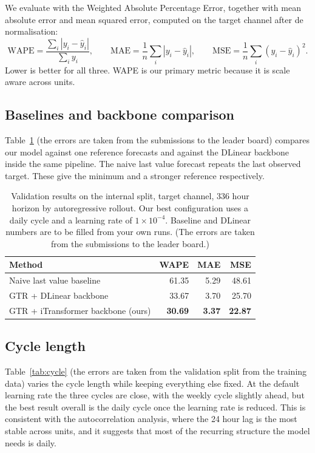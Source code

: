 \documentclass[11pt]{article}
\begin{document}
We evaluate with the Weighted Absolute Percentage Error, together with mean absolute error and
mean squared error, computed on the target channel after de normalisation:
\begin{equation}
\mathrm{WAPE} = \frac{\sum_i |y_i-\hat{y}_i|}{\sum_i y_i}, \qquad
\mathrm{MAE} = \frac{1}{n}\sum_i |y_i-\hat{y}_i|, \qquad
\mathrm{MSE} = \frac{1}{n}\sum_i (y_i-\hat{y}_i)^2 .
\end{equation}
Lower is better for all three. WAPE is our primary metric because it is scale aware across units.

\subsection{Baselines and backbone comparison}
Table~\ref{tab:main} (the errors are taken from the submissions to the leader board) compares 
our model against one reference forecasts and against the DLinear
backbone inside the same pipeline. The naive last value forecast repeats the last observed
target. These give the minimum and a stronger reference respectively.

\begin{table}[h]
\centering
\begin{tabular}{lrrr}
\toprule
Method & WAPE & MAE & MSE \\
\midrule
Naive last value baseline & 61.35 & 5.29 & 48.61 \\
GTR + DLinear backbone & 33.67 & 3.70 & 25.70 \\
GTR + iTransformer backbone (ours) & \textbf{30.69} & \textbf{3.37} & \textbf{22.87} \\
\bottomrule
\end{tabular}
\caption{Validation results on the internal split, target channel, 336 hour horizon by
autoregressive rollout. Our best configuration uses a daily cycle and a learning rate of
$1\times10^{-4}$. Baseline and DLinear numbers are to be filled from your own runs. 
(The errors are taken from the submissions to the leader board.)}
\label{tab:main}
\end{table}

\subsection{Cycle length}
Table~\ref{tab:cycle} (the errors are taken from the validation split from the training data) 
varies the cycle length while keeping everything else fixed. At the default
learning rate the three cycles are close, with the weekly cycle slightly ahead, but the best
result overall is the daily cycle once the learning rate is reduced. This is consistent with the
autocorrelation analysis, where the 24 hour lag is the most stable across units, and it suggests
that most of the recurring structure the model needs is daily.
\end{document}

